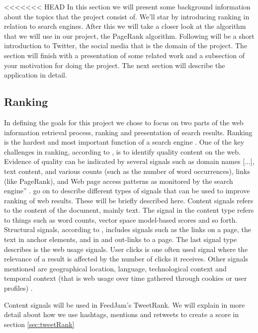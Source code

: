 <<<<<<< HEAD
In this section we will present some background information about the topics that the project consist of. We'll star by introducing ranking in relation to search engines. After this we will take a closer look at the algorithm that we will use in our project, the PageRank algorithm.  Following will be a short introduction to Twitter, the social media that is the domain of the project. The section will finish with a presentation of some related work and a subsection of your motivation for doing the project. The next section will describe the application in detail. 

\subsection{Ranking} 
In defining the goals for this project we chose to focus on two parts of the web information retrieval process, ranking and presentation of search results. Ranking is the hardest and most important function of a search engine \citep[p.469]{Baeza-Yates2010b}. One of the key challenges in ranking, according to \citet{Baeza-Yates2010b}, is to identify quality content on the web. Evidence of quality can be indicated by several signals such as domain names [...], text content, and various counts (such as the number of word occurrences), links (like PageRank), and Web page access patterns as monitored by the search engine” \citep[p.468]{Baeza-Yates2010b}. 
 \citet{Baeza-Yates2010b} go on to describe different types of signals that can be used to improve ranking of web results. These will be briefly described here. Content signals refers to the content of the document, mainly text. The signal in the content type refers to things such as word counts, vector space model-based scores and so forth. Structural signals, according to \citet{Baeza-Yates2010b}, includes signals such as the links on a page, the text in anchor elements, and in and out-links to a page.  The last signal type describes is the web usage signals. User clicks is one often used signal where the relevance of a result is affected by the number of clicks it receives. Other signals mentioned are geographical location, language, technological context and temporal context (that is web usage over time gathered through cookies or user profiles) \citep{Baeza-Yates2010b}.

Content signals will be used in FeedJam's TweetRank. We will explain in more detail about how we use hashtags, mentions and retweets to create a score in section \ref{sec:tweetRank} 

